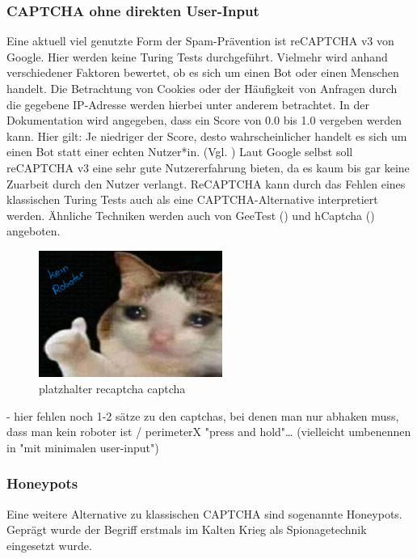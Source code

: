 \subsubsection*{CAPTCHA ohne direkten User-Input}
Eine aktuell viel genutzte Form der Spam-Prävention ist reCAPTCHA v3 von Google. 
Hier werden keine Turing Tests durchgeführt. 
Vielmehr wird anhand verschiedener Faktoren bewertet, ob es sich um einen Bot oder einen Menschen handelt.
Die Betrachtung von Cookies oder der Häufigkeit von Anfragen durch die gegebene IP-Adresse werden hierbei unter anderem betrachtet.
In der Dokumentation wird angegeben, dass ein Score von 0.0 bis 1.0 vergeben werden kann. 
Hier gilt: Je niedriger der Score, desto wahrscheinlicher handelt es sich um einen Bot statt einer echten Nutzer*in. (Vgl. \cite{recaptchadoc})
Laut Google selbst soll reCAPTCHA v3 eine sehr gute Nutzererfahrung bieten, da es kaum bis gar keine Zuarbeit durch den Nutzer verlangt. \cite{googleblog:recaptcha}
ReCAPTCHA kann durch das Fehlen eines klassischen Turing Tests auch als eine CAPTCHA-Alternative interpretiert werden.
Ähnliche Techniken werden auch von GeeTest (\cite{geetest}) und hCaptcha (\cite{hcaptcha}) angeboten.

\begin{figure}[h!]
    \centering\includegraphics[width=6cm]{gfx/mygraphics/platzhalter.png}
     \caption{platzhalter recaptcha captcha}
      \label{fig:recaptcha}
\end{figure}

- hier fehlen noch 1-2 sätze zu den captchas, bei denen man nur abhaken muss, dass man kein roboter ist / perimeterX "press and hold"\dots
 (vielleicht umbenennen in "mit minimalen user-input")


\subsubsection*{Honeypots}
Eine weitere Alternative zu klassischen CAPTCHA sind sogenannte Honeypots. 
Geprägt wurde der Begriff erstmals im Kalten Krieg als Spionagetechnik eingesetzt wurde. \cite[p.2]{joshi:2011} 

